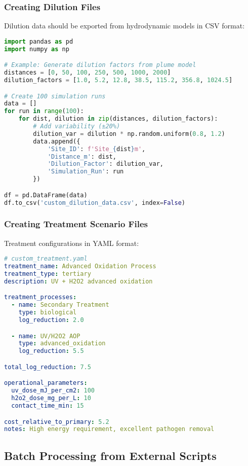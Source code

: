 \documentclass[11pt,a4paper]{article}
\begin{document}
\subsubsection{Creating Dilution Files}

Dilution data should be exported from hydrodynamic models in CSV format:

\begin{lstlisting}[style=pythonstyle, language=Python]
import pandas as pd
import numpy as np

# Example: Generate dilution factors from plume model
distances = [0, 50, 100, 250, 500, 1000, 2000]
dilution_factors = [1.0, 5.2, 12.8, 38.5, 115.2, 356.8, 1024.5]

# Create 100 simulation runs
data = []
for run in range(100):
    for dist, dilution in zip(distances, dilution_factors):
        # Add variability (±20%)
        dilution_var = dilution * np.random.uniform(0.8, 1.2)
        data.append({
            'Site_ID': f'Site_{dist}m',
            'Distance_m': dist,
            'Dilution_Factor': dilution_var,
            'Simulation_Run': run
        })

df = pd.DataFrame(data)
df.to_csv('custom_dilution_data.csv', index=False)
\end{lstlisting}

\subsubsection{Creating Treatment Scenario Files}

Treatment configurations in YAML format:

\begin{lstlisting}[style=bashstyle, language=yaml]
# custom_treatment.yaml
treatment_name: Advanced Oxidation Process
treatment_type: tertiary
description: UV + H2O2 advanced oxidation

treatment_processes:
  - name: Secondary Treatment
    type: biological
    log_reduction: 2.0

  - name: UV/H2O2 AOP
    type: advanced_oxidation
    log_reduction: 5.5

total_log_reduction: 7.5

operational_parameters:
  uv_dose_mJ_per_cm2: 100
  h2o2_dose_mg_per_L: 10
  contact_time_min: 15

cost_relative_to_primary: 5.2
notes: High energy requirement, excellent pathogen removal
\end{lstlisting}

\subsection{Batch Processing from External Scripts}
\end{document}

